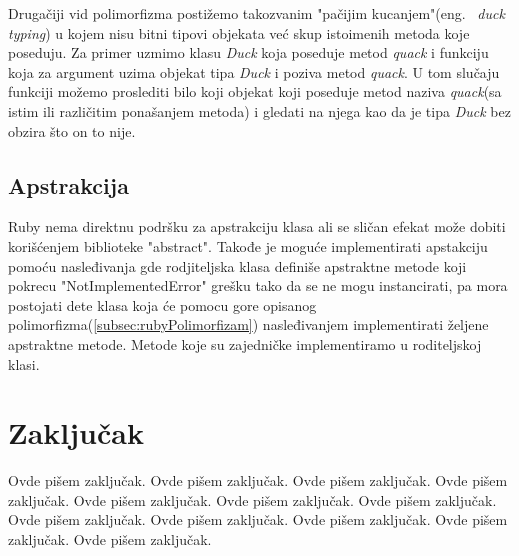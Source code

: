 \documentclass[a4paper]{article}
\begin{document}
Drugačiji vid polimorfizma postižemo takozvanim "pačijim kucanjem"(eng. ~{\em duck typing}) u kojem nisu bitni tipovi objekata već skup istoimenih metoda koje poseduju. Za primer uzmimo klasu \textit{Duck} koja poseduje metod  \textit{quack} i funkciju koja za argument uzima objekat tipa \textit{Duck} i poziva metod \textit{quack}. U tom slučaju funkciji možemo proslediti bilo koji objekat koji poseduje metod naziva \textit{quack}(sa istim ili različitim ponašanjem metoda) i gledati na njega kao da je tipa \textit{Duck} bez obzira što on to nije.

\subsection{Apstrakcija}
\label{subsec:rubyApstrakcija}
Ruby nema direktnu podršku za apstrakciju klasa ali se sličan efekat može dobiti korišćenjem biblioteke "abstract". Takođe je moguće implementirati apstakciju pomoću nasleđivanja gde rodjiteljska klasa definiše apstraktne metode koji pokrecu "NotImplementedError" grešku tako da se ne mogu instancirati, pa mora postojati dete klasa koja će pomocu gore opisanog polimorfizma(\ref{subsec:rubyPolimorfizam}) nasleđivanjem implementirati željene apstraktne metode. Metode koje su zajedničke implementiramo u roditeljskoj klasi.


\section{Zaključak}
\label{sec:zakljucak}

Ovde pišem zaključak. 
Ovde pišem zaključak. 
Ovde pišem zaključak. 
Ovde pišem zaključak. 
Ovde pišem zaključak. 
Ovde pišem zaključak. 
Ovde pišem zaključak. 
Ovde pišem zaključak. 
Ovde pišem zaključak. 
Ovde pišem zaključak. 
Ovde pišem zaključak. 
Ovde pišem zaključak. 


\appendix
 

\end{document}
